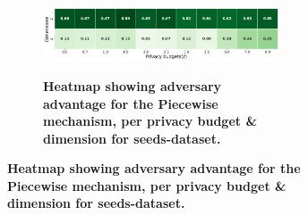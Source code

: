 \begin{figure}[H]
\begin{subfigure}[b]{0.85\textwidth}
    \begin{subfigure}[c]{1\textwidth}
      \caption{\textbf{Heatmap showing adversary advantage for the Piecewise mechanism, per privacy budget \& dimension for seeds-dataset.}}
      \includegraphics[width=1\textwidth]{Results/kd-laplace/piecewise/line-dataset/shokri_mi_adv.png}
      \label{fig:privacy_line-dataset_adversial_advantage_piecewise}
    \end{subfigure}
  \end{subfigure}
  \hfill %
  \begin{subfigure}[b]{0.075\textwidth}

\end{subfigure}
\end{figure}
